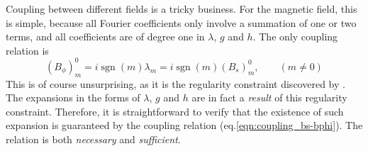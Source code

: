 \documentclass[a4paper, 11pt]{article}
\DeclareMathOperator{\sgn}{sgn}
\begin{document}
Coupling between different fields is a tricky business. For the magnetic field, this is simple, because all Fourier coefficients only involve a summation of one or two terms, and all coefficients are of degree one in $\lambda$, $g$ and $h$. The only coupling relation is
\begin{equation}\label{eqn:coupling_bs-bphi}
    \left(B_\phi\right)_m^0 = i \sgn(m) \lambda_m = i \sgn(m) \left(B_s\right)_m^0,\qquad (m\neq 0)
\end{equation}
This is of course unsurprising, as it is the regularity constraint discovered by \textcite{lewis_physical_1990}. The expansions in the forms of $\lambda$, $g$ and $h$ are in fact a \textit{result} of this regularity constraint. Therefore, it is straightforward to verify that the existence of such expansion is guaranteed by the coupling relation (eq.\ref{eqn:coupling_bs-bphi}). The relation is both \textit{necessary} and \textit{sufficient}.
\end{document}
